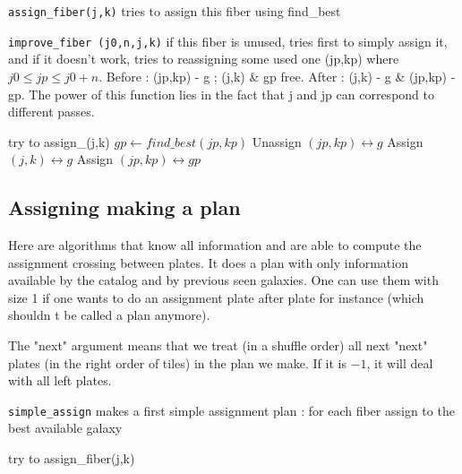 \documentclass{extarticle}
\begin{document}
\begin{multicols}{2}
{\tt assign\_fiber(j,k)} tries to assign this fiber using find\_best

{\tt improve\_fiber (j0,n,j,k)} if this fiber is unused, tries first to simply assign it, and if it doesn't work, tries to reassigning some used one (jp,kp) where $j0\le jp \le j0+n$. Before : (jp,kp) - g ; (j,k) \& gp free. After : (j,k) - g \& (jp,kp) - gp. The power of this function lies in the fact that j and jp can correspond to different passes.

\begin{algorithm}[H]
	\caption{Improve\_fiber(j0,n,j,k)}\label{euclid}
	\begin{algorithmic}[1]
		\State try to assign\_(j,k)
		\State $gp\leftarrow find\_best(jp,kp)$
		\State Unassign $(jp,kp) \longleftrightarrow g$
		\State Assign $(j,k) \longleftrightarrow g$
		\State Assign $(jp,kp) \longleftrightarrow gp$
		\EndIf
		\EndFor
		\EndIf
		\EndFor
		\EndIf
		\EndIf
	\end{algorithmic}
\end{algorithm}


\subsection{Assigning making a plan}
Here are algorithms that know all information and are able to compute the assignment crossing between plates. It does a plan with only information available by the catalog and by previous seen galaxies. One can use them with size 1 if one wants to do an assignment plate after plate for instance (which shouldn t be called a plan anymore).

The "next" argument means that we treat (in a shuffle order) all next "next" plates (in the right order of tiles) in the plan we make. If it is $-1$, it will deal with all left plates.

{\tt simple\_assign} makes a first simple assignment plan : for each fiber assign to the best available galaxy

\begin{algorithm}[H]
	\caption{Simple\_assign(j0,n)}\label{euclid}
	\begin{algorithmic}[1]
		\State try to assign\_fiber(j,k)
		\EndFor
		\EndFor
	\end{algorithmic}
\end{algorithm}


\end{multicols}
\end{document}
